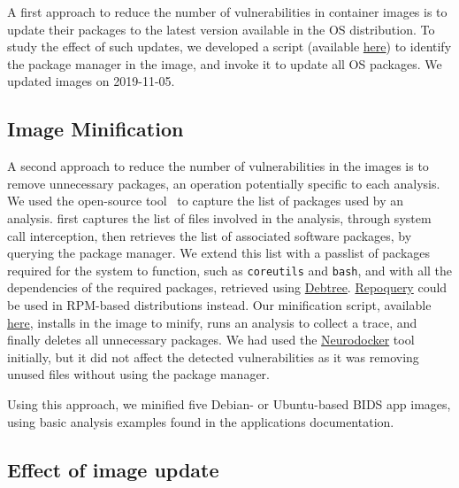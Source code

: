 A first approach to reduce the number of vulnerabilities in container
images is to update their packages to the latest version available in the OS
distribution. To study the effect of such updates, we developed a script
(available
\href{https://github.com/big-data-lab-team/container-vulnerabilities-paper/blob/master/Scripts/update}{here})
to identify the package manager in the image, and invoke it to update all
OS packages. We updated images on 2019-11-05.

\subsection{Image Minification}

A second approach to reduce the number of vulnerabilities in the images is
to remove unnecessary packages, an operation potentially specific to each
analysis. We used the open-source \reprozip tool~\cite{rampin2016reprozip}
to capture the list of packages used by an analysis. \reprozip first
captures the list of files involved in the analysis, through system call
interception, then retrieves the list of associated software packages, by
querying the package manager. We extend this list with a passlist of
packages required for the system to function, such as \texttt{coreutils}
and \texttt{bash}, and with all the dependencies of the required packages,
retrieved using
\href{http://manpages.ubuntu.com/manpages/xenial/man1/debtree.1.html}{Debtree}.
\href{https://linux.die.net/man/1/repoquery}{Repoquery} could be used in
RPM-based distributions instead. Our minification script, available
\href{https://github.com/big-data-lab-team/container-vulnerabilities-paper/tree/master/Scripts/minification}{here},
installs \reprozip in the image to minify, runs an analysis to collect a
\reprozip trace, and finally deletes all unnecessary packages. We had used
the \href{https://github.com/ReproNim/neurodocker}{Neurodocker} tool
initially, but it did not affect the detected vulnerabilities
as it was removing unused files without using the package manager.

Using this approach, we minified five Debian- or Ubuntu-based BIDS app images,
using basic analysis examples found in the applications documentation.

\subsection{Effect of image update}

